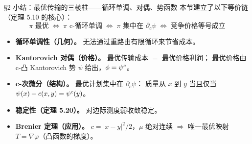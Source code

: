 \begin{frame}{§2 小结：最优传输的三棱柱——循环单调、对偶、势函数}
  本节建立了以下等价链（定理 5.10 的核心）：
  \[
    \pi\text{ 最优}
    \;\Longleftrightarrow\;
    \pi\text{ c-循环单调}
    \;\Longleftrightarrow\;
    \pi\text{ 集中在 }\partial_c\psi
    \;\Longleftrightarrow\;
    \text{竞争价格等号成立}
  \]

  \begin{itemize}\small
    \item \textbf{循环单调性（几何）。} 无法通过重路由有限循环来节省成本。
    \item \textbf{Kantorovich 对偶（价格）。} 最优传输成本 $=$ 最优价格利润；
      最优价格由 c-凸 Kantorovich 势 $\psi$ 给出，$\phi={\psi}^{c}$。
    \item \textbf{c-次微分（结构）。} 最优计划集中在 $\partial_c\psi$：
      质量从 $x$ 到 $y$ 当且仅当 $\psi(x)+c(x,y)={\psi}^{c}(y)$。
    \item \textbf{稳定性（定理 5.20）。} 对边际测度弱收敛稳定。
    \item \textbf{Brenier 定理（应用）。} $c=|x-y|^2/2$，$\mu$ 绝对连续 $\Rightarrow$ 唯一最优映射 $T=\nabla\varphi$（凸函数的梯度）。
  \end{itemize}

\end{frame}
